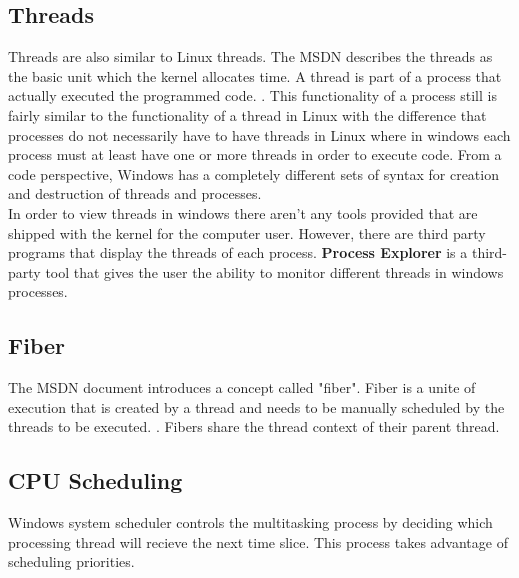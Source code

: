 \documentclass[journal,10pt,onecolumn,compsoc,letterpaper,draftclsnofoot,table,xcdraw]{IEEEtran} \usepackage[margin=0.75in]{geometry}
\begin{document}
\subsection{Threads}
\noindent Threads are also similar to Linux threads. The MSDN describes the threads as the basic unit which the kernel allocates time. A thread is part of a process that actually executed the programmed code. \cite{msdnprocess}. This functionality of a process still is fairly similar to the functionality of a thread in Linux with the difference that processes do not necessarily have to have threads in Linux where in windows each process must at least have one or more threads in order to execute code. From a code perspective, Windows has a completely different sets of syntax for creation and destruction of threads and processes.\\
\noindent In order to view threads in windows there aren't any tools provided that are shipped with the kernel for the computer user. However, there are third party programs that display the threads of each process. \textbf{Process Explorer} is a third-party tool that gives the user the ability to monitor different threads in windows processes.
\subsection{Fiber}
\noindent The MSDN document \cite{msdnprocess} introduces a concept called "fiber". Fiber is a unite of execution that is created by a thread and needs to be manually scheduled by the threads to be executed. \cite{msdnprocess}. Fibers share the thread context of their parent thread.
\subsection{CPU Scheduling}
\noindent Windows system scheduler controls the multitasking process by deciding which processing thread will recieve the next time slice. This process takes advantage of scheduling priorities.
\end{document}
